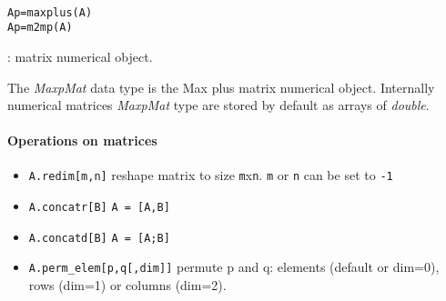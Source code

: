 
\begin{mandesc}
   \\
\end{mandesc}
\begin{calling_sequence}
\begin{verbatim}
Ap=maxplus(A)
Ap=m2mp(A)
\end{verbatim}
\end{calling_sequence}
\begin{parameters}
  \begin{varlist}
    : matrix numerical object.
  \end{varlist}
\end{parameters}

\begin{mandescription}

The \emph{MaxpMat} data type is the Max plus matrix numerical object. 
Internally numerical matrices \emph{MaxpMat} type are stored by default as 
arrays of \emph{double}.  
\end{mandescription}

\paragraph{Operations on matrices}
\begin{itemize}
\item \verb+A.redim[m,n]+ reshape matrix to size \verb+m+x\verb+n+. \verb+m+ or \verb+n+ can be set to \verb+-1+ 
\item \verb+A.concatr[B]+ \verb+A = [A,B]+
\item \verb+A.concatd[B]+ \verb+A = [A;B]+
\item \verb+A.perm_elem[p,q[,dim]]+ permute p and q: elements
  (default or dim=0), rows (dim=1) or columns (dim=2).
\end{itemize}

